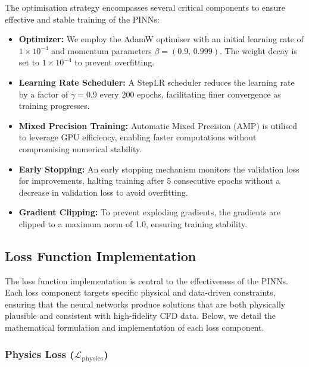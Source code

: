 \documentclass[12pt, a4paper]{article}
\begin{document}
The optimisation strategy encompasses several critical components to ensure effective and stable training of the PINNs:

\begin{itemize}
    \item \textbf{Optimizer:} We employ the AdamW optimiser \citep{loshchilov2017decoupled} with an initial learning rate of $1 \times 10^{-4}$ and momentum parameters $\beta = (0.9,\,0.999)$. The weight decay is set to $1 \times 10^{-4}$ to prevent overfitting.
    
    \item \textbf{Learning Rate Scheduler:} A StepLR scheduler reduces the learning rate by a factor of $\gamma = 0.9$ every 200 epochs, facilitating finer convergence as training progresses.
    
    \item \textbf{Mixed Precision Training:} Automatic Mixed Precision (AMP) is utilised to leverage GPU efficiency, enabling faster computations without compromising numerical stability.
    
    \item \textbf{Early Stopping:} An early stopping mechanism monitors the validation loss for improvements, halting training after 5 consecutive epochs without a decrease in validation loss to avoid overfitting.
    
    \item \textbf{Gradient Clipping:} To prevent exploding gradients, the gradients are clipped to a maximum norm of 1.0, ensuring training stability.
\end{itemize}

\subsection{Loss Function Implementation}
\label{sec:Loss_Function_Implementation}

The loss function implementation is central to the effectiveness of the PINNs. Each loss component targets specific physical and data-driven constraints, ensuring that the neural networks produce solutions that are both physically plausible and consistent with high-fidelity CFD data. Below, we detail the mathematical formulation and implementation of each loss component.

\subsubsection{Physics Loss ($\mathcal{L}_{\mathrm{physics}}$)}
\end{document}
